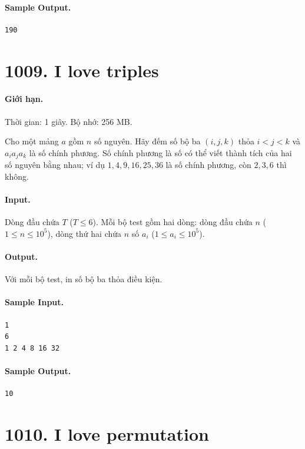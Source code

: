 \documentclass[11pt]{article}
\begin{document}
\paragraph{Sample Output.}
\begin{verbatim}
190
\end{verbatim}

\section{1009. I love triples}

\paragraph{Giới hạn.} Thời gian: 1 giây. Bộ nhớ: 256 MB.

Cho một mảng $a$ gồm $n$ số nguyên.  Hãy đếm số bộ ba $(i,j,k)$ thỏa
$i<j<k$ và $a_i a_j a_k$ là số chính phương.  Số chính phương là số có thể viết
thành tích của hai số nguyên bằng nhau; ví dụ $1,4,9,16,25,36$ là số chính
phương, còn $2,3,6$ thì không.

\paragraph{Input.}
Dòng đầu chứa $T$ ($T\le 6$).  Mỗi bộ test gồm hai dòng: dòng đầu chứa $n$
($1\le n\le 10^5$), dòng thứ hai chứa $n$ số $a_i$ ($1\le a_i\le 10^5$).

\paragraph{Output.}
Với mỗi bộ test, in số bộ ba thỏa điều kiện.

\paragraph{Sample Input.}
\begin{verbatim}
1
6
1 2 4 8 16 32
\end{verbatim}

\paragraph{Sample Output.}
\begin{verbatim}
10
\end{verbatim}

\section{1010. I love permutation}
\end{document}
